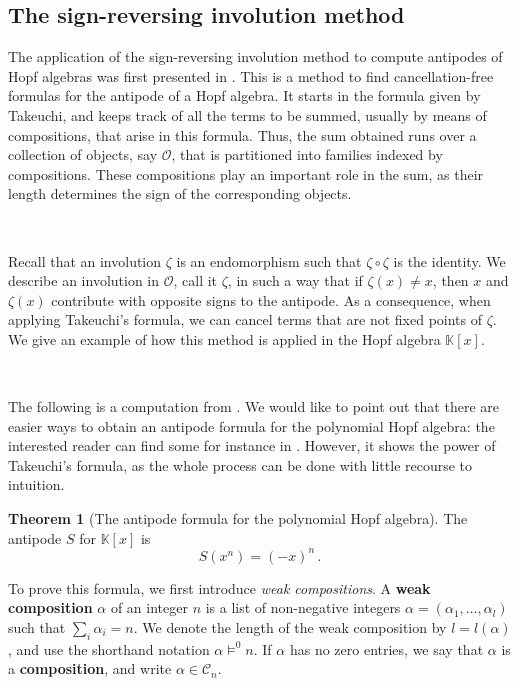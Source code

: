 \documentclass[12pt, reqno]{amsart}
\theoremstyle{definition}
\newtheorem{thm}{Theorem}[section]
\begin{document}
\subsection{The sign-reversing involution method}

The application of the sign-reversing involution method to compute antipodes of Hopf algebras was first presented in \cite{BS2017}.
This is a method to find cancellation-free formulas for the antipode of a Hopf algebra.
It starts in the formula given by Takeuchi, and keeps track of all the terms to be summed, usually by means of compositions, that arise in this formula.
Thus, the sum obtained runs over a collection of objects, say $\mathcal O$, that is partitioned into families indexed by compositions.
These compositions play an important role in the sum, as their length determines the sign of the corresponding objects.

\

Recall that an involution $\zeta $ is an endomorphism such that $\zeta \circ \zeta$ is the identity.
We describe an involution in $\mathcal O$, call it $\zeta $, in such a way that if $\zeta(x) \neq x$, then $x$ and $\zeta(x)$ contribute with opposite signs to the antipode.
As a consequence, when applying Takeuchi's formula, we can cancel terms that are not fixed points of $\zeta$.
We give an example of how this method is applied in the Hopf algebra $\mathbb{K}[x]$.

\

The following is a computation from \cite{BS2017}.
We would like to point out that there are easier ways to obtain an antipode formula for the polynomial Hopf algebra: the interested reader can find some for instance in \cite{GrinbergReiner}.
However, it shows the power of Takeuchi’s formula, as the whole process can be done with little recourse to intuition.


\begin{thm}[The antipode formula for the polynomial Hopf algebra]\label{thm:polyHA}
The antipode $S$ for $\mathbb{K}[x] $ is 
$$ S(x^n) =(-x)^n\, . $$
\end{thm}

To prove this formula, we first introduce \textit{weak compositions}.
A \textbf{weak composition} $\alpha$ of an integer $n$ is a list of non-negative integers $\alpha = (\alpha_1, \dots , \alpha_l)$ such that $\sum_i \alpha_i = n$.
We denote the length of the weak composition by $l = l(\alpha)$, and use the shorthand notation $\alpha \models^0 n$.
If $\alpha $ has no zero entries, we say that $\alpha$ is a \textbf{composition}, and write $\alpha \in \mathcal C_n$.
\end{document}
